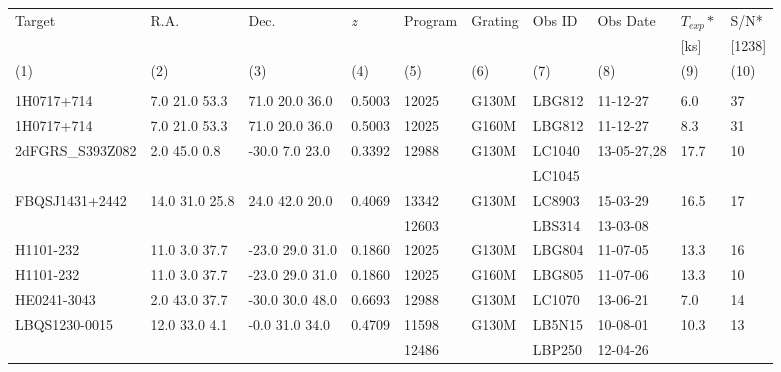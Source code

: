 \documentclass[iop]{emulateapj-rtx4}
\begin{document}
\begin{table}[ht]\footnotesize
\begin{center}
\begin{tabular}{l l l l l l l l l l}
 \hline \hline
  Target 		& R.A. 		& Dec. 		& \textit{z}		 & Program 	  & Grating 	  & Obs ID 	    & Obs Date 	    & $T_{exp}*$     & S/N*  \\ 
  	    		& 	       		&	  		& 		  	 & 		    	  & 		  	  & 		  	   & 		     	    & 	        [ks]        & [1238] \\ 
 \scriptsize (1)  & \scriptsize (2) & \scriptsize (3) & \scriptsize (4) & \scriptsize (5) & \scriptsize (6) & \scriptsize  (7) & \scriptsize (8) & \scriptsize (9) & \scriptsize (10)  \\ \hline \hline

\\
    
1H0717+714		  &  7.0  21.0   53.3  &     71.0  20.0  36.0  &    0.5003  & 12025  	    &   G130M  &   LBG812  		 & 11-12-27      	 	  &  6.0    &      37         \\
1H0717+714       	  &  7.0  21.0   53.3  &     71.0  20.0  36.0  &    0.5003  & 12025  	    &   G160M  &   LBG812  		 & 11-12-27      	 	  &  8.3    &      31         \\
2dFGRS\_S393Z082  &  2.0  45.0    0.8   &    -30.0    7.0  23.0  &    0.3392  & 12988  	    &   G130M  &   LC1040    		 & 13-05-27,28 	 	  & 17.7   &      10         \\
				  &			       &				&		  &			    &		      &    LC1045			 &				  &	       &		   \\
FBQSJ1431+2442     & 14.0  31.0  25.8  &     24.0  42.0  20.0  &   0.4069   & 13342		    &   G130M  &   LC8903			& 15-03-29		  & 16.5  &      17          \\
				 &			      &				       &		 & 12603		    &		      &   LBS314			& 13-03-08		  &	      &		  	  \\

H1101-232   		 &  11.0  3.0   37.7  &    -23.0  29.0  31.0  &   0.1860   & 12025  		    &   G130M  &   LBG804  		& 11-07-05  		   & 13.3  &      16         \\
H1101-232   		 &  11.0  3.0   37.7  &    -23.0  29.0  31.0  &   0.1860   & 12025 		    &   G160M  &   LBG805  		& 11-07-06  		   & 13.3  &      10         \\
HE0241-3043  		 &   2.0  43.0  37.7  &    -30.0  30.0  48.0  &   0.6693   & 12988  		    &   G130M  &   LC1070  		& 13-06-21  		   & 7.0    &      14         \\
LBQS1230-0015  	 &   12.0  33.0  4.1  &    -0.0  31.0  34.0    &    0.4709  & 11598   	    &   G130M  &   LB5N15			& 10-08-01  		   & 10.3  &      13         \\
				 &			      &				       &		 & 12486		    &		      &   LBP250			& 12-04-26		   &	       &	  	   \\


\end{tabular}
\end{center}
\end{table}
\end{document}

